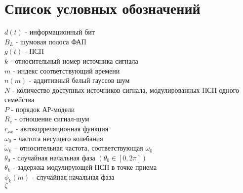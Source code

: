 \chapter*{Список условных обозначений}
\noindent
${d(t)}$ - информационный бит 			\\
${B_L}$ - шумовая полоса ФАП			\\
${g(t)}$ - ПСП 					\\
${k}$ - относительный номер источника сигнала	\\
${m}$ - индекс соответствующий времени	\\
${n(m)}$ - аддитивный белый гауссов шум \\
${N}$ - количество доступных источников сигнала, модулированных ПСП одного семейства \\
${P}$ - порядок АР-модели \\
${R_e}$ - отношение сигнал-шум \\
${r_{xx}}$ - автокорреляционная функция \\

\noindent
${\omega_0}$ - частота несущего колебания \\
${\tilde{\omega}_{k}}$  – относительная частота, соответствующая ${\omega_0}$ \\
${\theta_0}$ - случайная начальная фаза ${(\theta_0 \in [0, 2\pi])}$ \\
${\theta_k}$ - задержка модулирующей ПСП в точке приема \\
${\phi_k(m)}$ - случайная начальная фаза \\
${\zeta}$

\newpage
